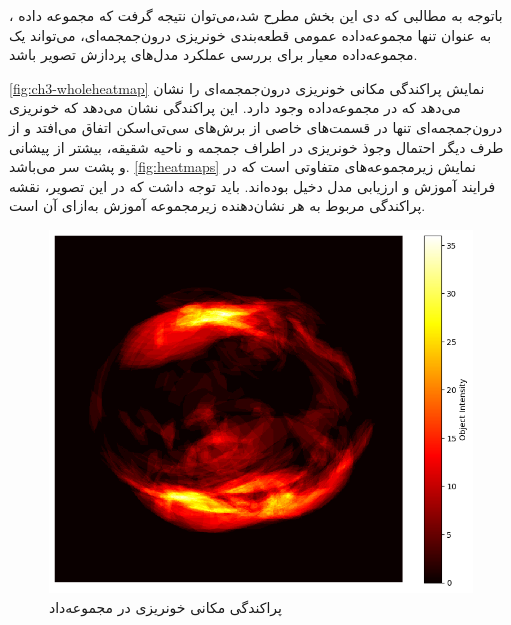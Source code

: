 باتوجه به مطالبی که دی این بخش مطرح شد،‌می‌توان نتیجه‌ گرفت که مجموعه داده
 ،
به عنوان تنها مجموعه‌داده عمومی قطعه‌بندی خونریزی درون‌جمجمه‌ای، می‌تواند یک مجموعه‌داده معیار برای بررسی عملکرد مدل‌های پردازش تصویر باشد. 

\autoref{fig:ch3-wholeheatmap}
نمایش پراکندگی مکانی خونریزی درون‌جمجمه‌ای را نشان می‌دهد که در مجموعه‌داده
وجود دارد. این پراکندگی نشان می‌دهد که خونریزی درون‌جمجمه‌ای تنها در قسمت‌های خاصی از برش‌های سی‌تی‌اسکن اتفاق می‌افتد و از طرف دیگر احتمال وجوذ خونریزی در اطراف جمجمه و ناحیه شقیقه،‌ بیشتر از پیشانی و پشت سر می‌باشد.
\autoref{fig:heatmaps}
نمایش زیرمجموعه‌های متفاوتی است که در فرایند آموزش و ارزیابی مدل دخیل بوده‌اند. باید توجه داشت که در این تصویر، نقشه پراکندگی مربوط‌ به هر 
نشان‌دهنده زیرمجموعه آموزش به‌ازای آن 
است.  
\begin{figure}[h]
\centering
\includegraphics[width=1.0\linewidth]{Images/Chapter2/whole_heatmap}
\caption{ پراکندگی مکانی خونریزی در مجموعه‌داد
}
\label{fig:ch3-wholeheatmap}
\end{figure}


